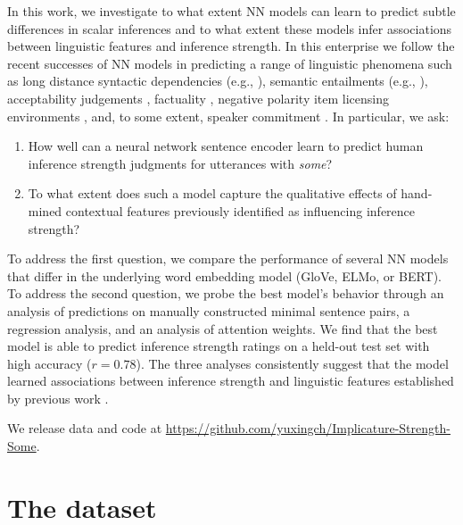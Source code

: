 \documentclass[11pt,a4paper]{article}
\begin{document}
In this work, we investigate to what extent NN models can learn to predict subtle differences in scalar inferences and to what extent these models infer associations between linguistic features and inference strength. 
In this enterprise we follow  the recent successes of  NN models in predicting a range of linguistic phenomena such as long distance syntactic dependencies (e.g., \citealt{Elman1990,Linzen2016,Gulordava2018,Futrell2019,Wilcox2019}), semantic entailments (e.g., \citealt{Bowman2015,Conneau2018}), acceptability judgements \citep{Warstadt2018}, factuality \citep{Rudinger2018},  negative polarity item licensing environments \citep{Warstadt2019}, and,  to  some  extent, speaker commitment \citep{Jiang2019}.  In particular, we ask: 
\vspace{-.4em}
\begin{enumerate}
\itemsep0em 
	\item How well can a neural network sentence encoder learn to predict human inference strength judgments for utterances with \emph{some}? 
	\item To what extent does such a model capture the qualitative effects of hand-mined contextual features previously identified as influencing inference strength?
\end{enumerate}
\vspace{-.4em}
To address the first question, we compare the performance of several NN models that differ in the underlying word embedding model (GloVe, ELMo, or BERT). To address the second question, we probe the best model's behavior through an analysis of predictions on manually constructed minimal sentence pairs, a regression analysis, and an analysis of attention weights. We find that the best model is able to predict inference strength ratings on a held-out test set with high accuracy ($r=0.78$). The three analyses consistently suggest that the model learned associations between inference strength and linguistic features established by previous work \citep{degen2015investigating}.

We release data and code at \url{https://github.com/yuxingch/Implicature-Strength-Some}.

\section{The dataset} \label{sec:dataset}
\end{document}
